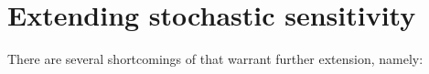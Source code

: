 
\chapter{Extending stochastic sensitivity}

There are several shortcomings of \cite{Balasuriya_2020_StochasticSensitivityComputable} that warrant further extension, namely:




